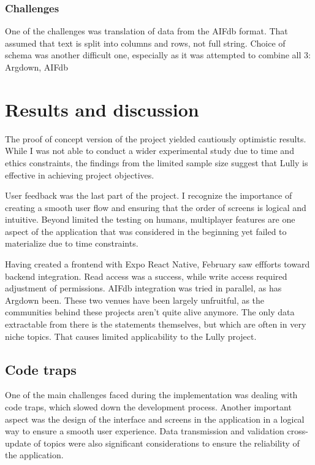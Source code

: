 \documentclass{report}
\begin{document}
{\subsection{Challenges}

One of the challenges was translation of data from the AIFdb format. That assumed that text is split into columns and rows, not full string.
Choice of schema was another difficult one, especially as it was attempted to combine all 3: Argdown, AIFdb
\cite{abbott_internet_2016}

\chapter{Results and discussion}

The proof of concept version of the  project yielded cautiously optimistic results. While I was not able to conduct a wider experimental study due to time and ethics constraints, the findings from the limited sample size suggest that Lully is effective in achieving project objectives. 

User feedback was the last part of the project. I recognize the importance of creating a smooth user flow and ensuring that the order of screens is logical and intuitive. Beyond limited the testing on humans, multiplayer features are one aspect of the application that was considered in the beginning yet failed to materialize due to time constraints. 

Having created a frontend with Expo React Native, February saw effforts toward backend integration. Read access was a success, while write access required adjustment of permissions. AIFdb integration was tried in parallel, as has Argdown been. These two venues have been largely unfruitful, as the communities behind these projects aren't quite alive anymore. The only data extractable from there is the statements themselves, but which are often in very niche topics. That causes limited applicability to the Lully project. 

\section{Code traps}
One of the main challenges faced during the implementation was dealing with code traps, which slowed down the development process. Another important aspect was the design of the interface and screens in the application in a logical way to ensure a smooth user experience. Data transmission and validation cross-update of topics were also significant considerations to ensure the reliability of the application.

}
\end{document}
